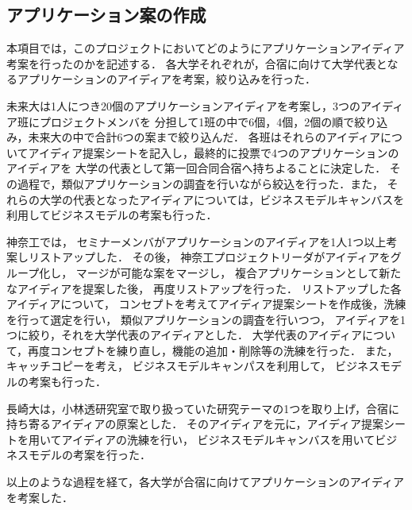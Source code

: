 \subsection{アプリケーション案の作成}

\par
本項目では，このプロジェクトにおいてどのようにアプリケーションアイディア考案を行ったのかを記述する．
各大学それぞれが，合宿に向けて大学代表となるアプリケーションのアイディアを考案，絞り込みを行った．

\par
未来大は1人につき20個のアプリケーションアイディアを考案し，3つのアイディア班にプロジェクトメンバを
分担して1班の中で6個，4個，2個の順で絞り込み，未来大の中で合計6つの案まで絞り込んだ．
各班はそれらのアイディアについてアイディア提案シートを記入し，最終的に投票で4つのアプリケーションのアイディアを
大学の代表として第一回合同合宿へ持ちよることに決定した．
その過程で，類似アプリケーションの調査を行いながら絞込を行った．また，
それらの大学の代表となったアイディアについては，ビジネスモデルキャンバスを利用してビジネスモデルの考案も行った．

\par
神奈工では， セミナーメンバがアプリケーションのアイディアを1人1つ以上考案しリストアップした．
その後， 神奈工プロジェクトリーダがアイディアをグループ化し， マージが可能な案をマージし，
複合アプリケーションとして新たなアイディアを提案した後， 再度リストアップを行った．
リストアップした各アイディアについて， コンセプトを考えてアイディア提案シートを作成後，洗練を行って選定を行い，
類似アプリケーションの調査を行いつつ， アイディアを1つに絞り，それを大学代表のアイディアとした．
大学代表のアイディアについて，再度コンセプトを練り直し，機能の追加・削除等の洗練を行った．
また， キャッチコピーを考え， ビジネスモデルキャンパスを利用して， ビジネスモデルの考案も行った．

\par 
長崎大は，小林透研究室で取り扱っていた研究テーマの1つを取り上げ，合宿に持ち寄るアイディアの原案とした．
そのアイディアを元に，アイディア提案シートを用いてアイディアの洗練を行い，
ビジネスモデルキャンバスを用いてビジネスモデルの考案を行った．

\par
以上のような過程を経て，各大学が合宿に向けてアプリケーションのアイディアを考案した．
